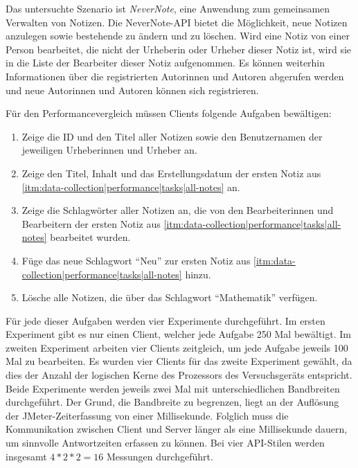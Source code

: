 Das untersuchte Szenario ist \textit{NeverNote}, eine Anwendung zum gemeinsamen Verwalten von Notizen. Die NeverNote-API bietet die Möglichkeit, neue Notizen anzulegen sowie bestehende zu ändern und zu löschen. Wird eine Notiz von einer Person bearbeitet, die nicht der Urheberin oder Urheber dieser Notiz ist, wird sie in die Liste der Bearbeiter dieser Notiz aufgenommen. Es können weiterhin Informationen über die registrierten Autorinnen und Autoren abgerufen werden und neue Autorinnen und Autoren können sich registrieren.

\para{}Für den Performancevergleich müssen Clients folgende Aufgaben bewältigen:

\begin{enumerate}[label=\textbf{T\arabic*}]
    \item\label{itm:data-collection|performance|tasks|all-notes} Zeige die ID und den Titel aller Notizen sowie den Benutzernamen der jeweiligen Urheberinnen und Urheber an.
    \item\label{itm:data-collection|performance|tasks|first-note} Zeige den Titel, Inhalt und das Erstellungsdatum der ersten Notiz aus \ref{itm:data-collection|performance|tasks|all-notes} an.
    \item\label{itm:data-collection|performance|tasks|related-keywords} Zeige die Schlagwörter aller Notizen an, die von den Bearbeiterinnen und Bearbeitern der ersten Notiz aus \ref{itm:data-collection|performance|tasks|all-notes} bearbeitet wurden.
    \item\label{itm:data-collection|performance|tasks|add-keyword} Füge das neue Schlagwort \enquote{Neu} zur ersten Notiz aus \ref{itm:data-collection|performance|tasks|all-notes} hinzu.
    \item\label{itm:data-collection|performance|tasks|delete-with-keyword} Lösche alle Notizen, die über das Schlagwort \enquote{Mathematik} verfügen.
\end{enumerate}
Für jede dieser Aufgaben werden vier Experimente durchgeführt. Im ersten Experiment gibt es nur einen Client, welcher jede Aufgabe 250 Mal bewältigt. Im zweiten Experiment arbeiten vier Clients zeitgleich, um jede Aufgabe jeweils 100 Mal zu bearbeiten. Es wurden vier Clients für das zweite Experiment gewählt, da dies der Anzahl der logischen Kerne des Prozessors des Versuchsgeräts entspricht. Beide Experimente werden jeweils zwei Mal mit unterschiedlichen Bandbreiten durchgeführt. Der Grund, die Bandbreite zu begrenzen, liegt an der Auflösung der JMeter-Zeiterfassung von einer Millisekunde. Folglich muss die Kommunikation zwischen Client und Server länger als eine Millisekunde dauern, um sinnvolle Antwortzeiten erfassen zu können. Bei vier API-Stilen werden insgesamt \(4 * 2 * 2 = 16\) Messungen durchgeführt.

